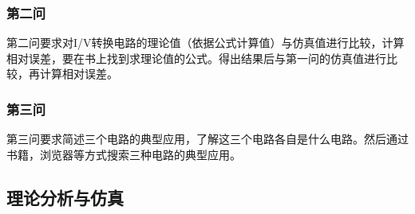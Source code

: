 \documentclass[./测控三级项目.tex]{subfiles} %
\begin{document}
		\subsubsection{第二问}
			第二问要求对I/V转换电路的理论值（依据公式计算值）与仿真值进行比较，计算相对误差，要在书上找到求理论值的公式。得出结果后与第一问的仿真值进行比较，再计算相对误差。
		\subsubsection{第三问}
			第三问要求简述三个电路的典型应用，了解这三个电路各自是什么电路。然后通过书籍，浏览器等方式搜索三种电路的典型应用。
		
	\subsection{理论分析与仿真}
\end{document}
